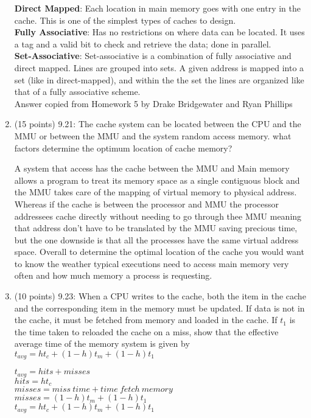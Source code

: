 \documentclass[letterpaper,10pt,onecolumn,titlepage]{article}
\begin{document}
\begin{enumerate}
\begin{mdframed}[style=MyFrame]
\textbf{Direct Mapped}: Each location in main memory goes with one entry in the cache. This is one of the simplest types of caches to design.\\
\textbf{Fully Associative}: Has no restrictions on where data can be located. It uses a tag and a valid bit to check and retrieve the data; done in parallel. \\
\textbf{Set-Associative}: Set-associative is a combination of fully associative and direct mapped. Lines are grouped into sets. A given address is mapped into a set (like in direct-mapped), and within the the set the lines are organized like that of a fully associative scheme. \\
Answer copied from Homework 5 by Drake Bridgewater and Ryan Phillips \cite{HW5}
\end{mdframed}
\item (15 points) 9.21: The cache system can be located between the CPU and the MMU or between the MMU and the system random access memory. what factors determine the optimum location of cache memory?
\begin{mdframed}[style=MyFrame]
A system that access has the cache between the MMU and Main memory allows a program to treat its memory space as a single contiguous block and the MMU takes care of the mapping of virtual memory to physical address.  Whereas if the cache is between the processor and MMU the processor addressees cache directly without needing to go through thee MMU meaning that address don't have to be translated by the MMU saving precious time, but the one downside is that all the processes have the same virtual address space. Overall to determine the optimal location of the cache you would want to know the weather typical executions need to access main memory very often and how much memory a process is requesting. 
\end{mdframed}

\item (10 points) 9.23: When a CPU  writes to the cache, both the item in the cache and the corresponding item in the memory must be updated. If data is not in the cache, it must be fetched from memory and loaded in the cache. If $t_1$ is the time taken to reloaded the cache on a miss, show that the effective average time of the memory system is given by $t_{avg}=ht_c+(1-h)t_m+(1-h)t_1$

\begin{mdframed}[style=MyFrame]
 $t_{avg}=hits+misses$\\
 $hits=ht_c$\\
 $misses=miss~time+time~fetch~memory$\\
 $misses=(1-h)t_m+(1-h)t_1$\\
 $t_{avg}=ht_c+(1-h)t_m+(1-h)t_1$
 

\end{mdframed}
\end{enumerate}
\end{document}
